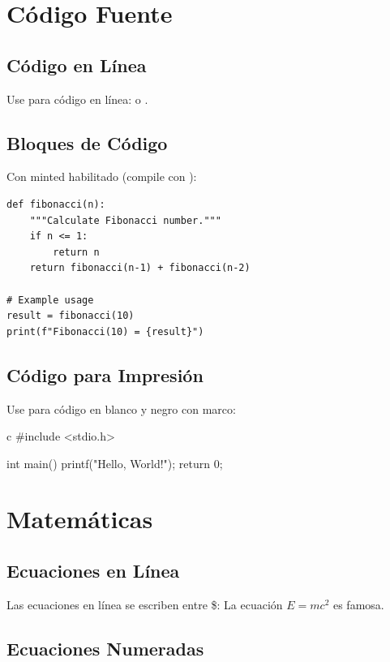 \documentclass{pt-article}
\begin{document}
\section{Código Fuente}

\subsection{Código en Línea}

Use  para código en línea:
 o .

\subsection{Bloques de Código}

Con minted habilitado (compile con ):

\begin{verbatim}
def fibonacci(n):
    """Calculate Fibonacci number."""
    if n <= 1:
        return n
    return fibonacci(n-1) + fibonacci(n-2)

# Example usage
result = fibonacci(10)
print(f"Fibonacci(10) = {result}")
\end{verbatim}

\subsection{Código para Impresión}

Use  para código en blanco y negro con marco:

\begin{ptprintcode}{c}
#include <stdio.h>

int main() {
    printf("Hello, World!\n");
    return 0;
}
\end{ptprintcode}

\section{Matemáticas}

\subsection{Ecuaciones en Línea}

Las ecuaciones en línea se escriben entre \$: La ecuación $E = mc^2$ es famosa.

\subsection{Ecuaciones Numeradas}
\end{document}
